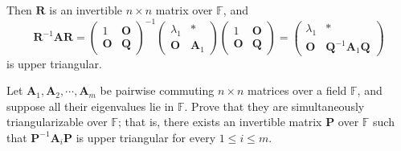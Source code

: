 \documentclass[12pt, a4paper, oneside]{book}
\begin{document}
\begin{theorem}
\[    \]
    Then $\mathbf{R}$ is an invertible $n \times n$ matrix over $\mathbb{F}$, and
    \[
        \mathbf{R}^{-1} \mathbf{A} \mathbf{R}=\left(\begin{array}{cc}
            1          & \mathbf{O} \\
            \mathbf{O} & \mathbf{Q}
        \end{array}\right)^{-1}\left(\begin{array}{cc}
                \lambda_1  & *            \\
                \mathbf{O} & \mathbf{A}_1
            \end{array}\right)\left(\begin{array}{cc}
                1          & \mathbf{O} \\
                \mathbf{O} & \mathbf{Q}
            \end{array}\right)=\left(\begin{array}{cc}
                \lambda_1  & *                                       \\
                \mathbf{O} & \mathbf{Q}^{-1} \mathbf{A}_1 \mathbf{Q}
            \end{array}\right)
    \]
    is upper triangular.
\end{theorem}
\begin{theorem}
    Let $\mathbf{A}_1, \mathbf{A}_2, \cdots, \mathbf{A}_m$ be pairwise commuting $n \times n$ matrices over a field $\mathbb{F}$, and suppose all their eigenvalues lie in $\mathbb{F}$. Prove that they are simultaneously triangularizable over $\mathbb{F}$; that is, there exists an invertible matrix $\mathbf{P}$ over $\mathbb{F}$ such that $\mathbf{P}^{-1} \mathbf{A}_i \mathbf{P}$ is upper triangular for every $1 \leq i \leq m$.
\end{theorem}
\end{document}
